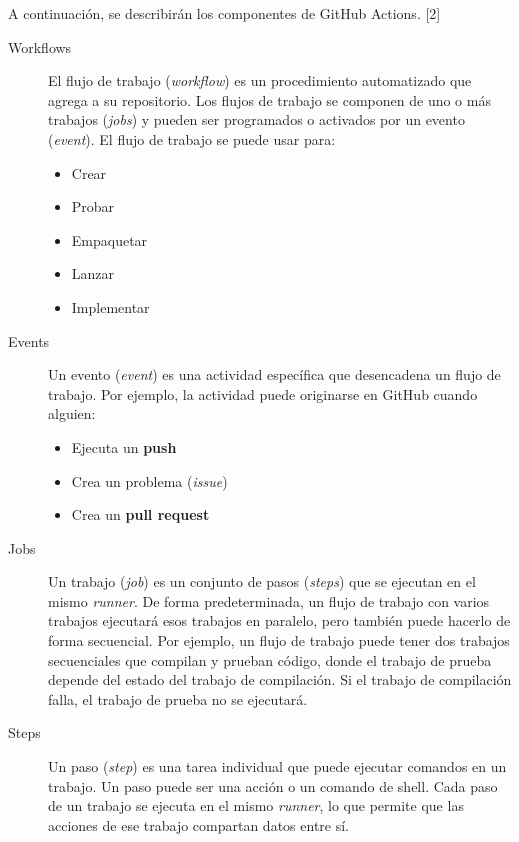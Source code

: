 \documentclass[twoside,twocolumn]{article}
\begin{document}
A continuación, se describirán los componentes de GitHub Actions. [2]

\begin{description}
    
    \item[Workflows]
    El flujo de trabajo (\textit{workflow}) es un procedimiento automatizado que agrega a su repositorio. Los flujos de trabajo se componen de uno o más trabajos (\textit{jobs}) y pueden ser programados o activados por un evento (\textit{event}). El flujo de trabajo se puede usar para:
    
    \begin{itemize}
        \item Crear
        \item Probar
        \item Empaquetar
        \item Lanzar
        \item Implementar
    \end{itemize}

    \item[Events]
    Un evento (\textit{event}) es una actividad específica que desencadena un flujo de trabajo. Por ejemplo, la actividad puede originarse en GitHub cuando alguien:

    \begin{itemize}
        \item Ejecuta un \textbf{push}
        \item Crea un problema (\textit{issue})
        \item Crea un \textbf{pull request}
    \end{itemize}

    \item[Jobs]
    Un trabajo (\textit{job}) es un conjunto de pasos (\textit{steps}) que se ejecutan en el mismo \textit{runner}. De forma predeterminada, un flujo de trabajo con varios trabajos ejecutará esos trabajos en paralelo, pero también puede hacerlo de forma secuencial. Por ejemplo, un flujo de trabajo puede tener dos trabajos secuenciales que compilan y prueban código, donde el trabajo de prueba depende del estado del trabajo de compilación. Si el trabajo de compilación falla, el trabajo de prueba no se ejecutará.

    \item[Steps]
    Un paso (\textit{step}) es una tarea individual que puede ejecutar comandos en un trabajo. Un paso puede ser una acción o un comando de shell. Cada paso de un trabajo se ejecuta en el mismo \textit{runner}, lo que permite que las acciones de ese trabajo compartan datos entre sí.


\end{description}
\end{document}
